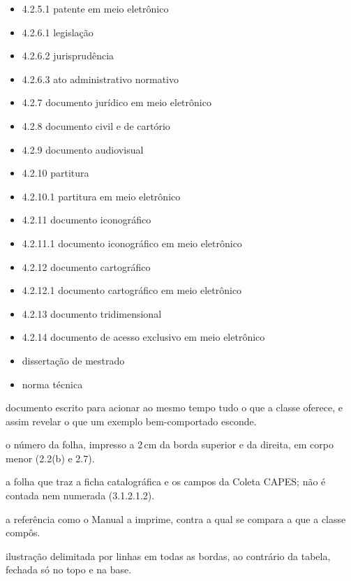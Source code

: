 \documentclass[dsc,pdfa,coorientador,numbers,twoside,orientadorexamina]{coppe}
\begin{document}
\begin{itemize}
    \item 4.2.5.1 patente em meio eletrônico \citep{m-4251}
    \item 4.2.6.1 legislação \citep{m-4261}
    \item 4.2.6.2 jurisprudência \citep{m-4262}
    \item 4.2.6.3 ato administrativo normativo \citep{m-4263}
    \item 4.2.7 documento jurídico em meio eletrônico \citep{m-427}
    \item 4.2.8 documento civil e de cartório \citep{m-428}
    \item 4.2.9 documento audiovisual \citep{m-429}
    \item 4.2.10 partitura \citep{m-42101}
    \item 4.2.10.1 partitura em meio eletrônico \citep{m-42102}
    \item 4.2.11 documento iconográfico \citep{m-42111}
    \item 4.2.11.1 documento iconográfico em meio eletrônico \citep{m-42112}
    \item 4.2.12 documento cartográfico \citep{m-42121}
    \item 4.2.12.1 documento cartográfico em meio eletrônico \citep{m-42122}
    \item 4.2.13 documento tridimensional \citep{m-42131}
    \item 4.2.14 documento de acesso exclusivo em meio eletrônico \citep{m-4214}
    \item dissertação de mestrado \citep{m-diss}
    \item norma técnica \citep{m-norma}
  \end{itemize}

  \backmatter
  \nocite{article-example,manualbib}
  \printbibliography

  \begin{theglossary}
    \item[Adversativo] documento escrito para acionar ao mesmo tempo
      tudo o que a classe oferece, e assim revelar o que um exemplo
      bem-comportado esconde.
    \item[Fólio] o número da folha, impresso a 2\,cm da borda superior
      e da direita, em corpo menor (2.2(b) e 2.7).
    \item[Folha adicional] a folha que traz a ficha catalográfica e os
      campos da Coleta CAPES; não é contada nem numerada (3.1.2.1.2).
    \item[Gabarito] a referência como o Manual a imprime, contra a qual
      se compara a que a classe compôs.
    \item[Quadro] ilustração delimitada por linhas em todas as bordas,
      ao contrário da tabela, fechada só no topo e na base.
  \end{theglossary}
\end{document}
